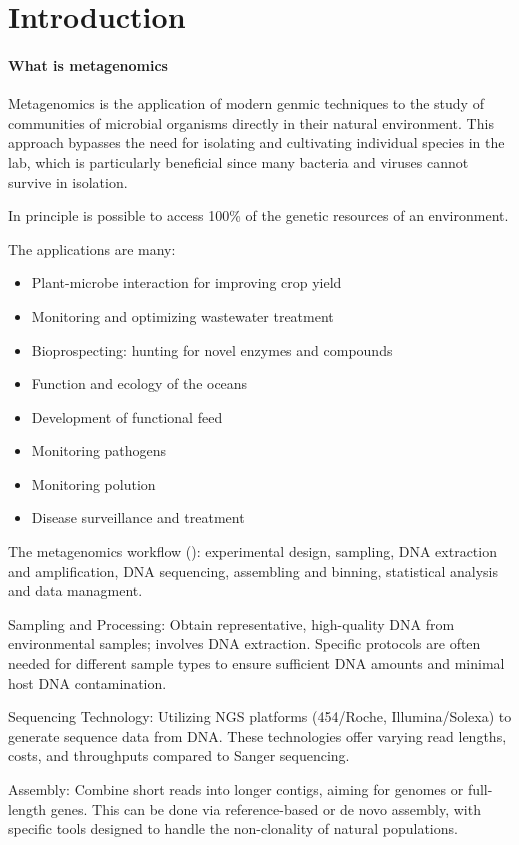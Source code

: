 \section{Introduction}
\paragraph{What is metagenomics} Metagenomics is the application of modern genmic techniques to the study of communities of microbial organisms directly in their natural environment. This approach bypasses the need for isolating and cultivating individual species in the lab, which is particularly beneficial since many bacteria and viruses cannot survive in isolation.

In principle is possible to access 100\% of the genetic resources of an environment.

The applications are many:
\begin{itemize}
    \item Plant-microbe interaction for improving crop yield
    \item Monitoring and optimizing wastewater treatment
    \item Bioprospecting: hunting for novel enzymes and compounds
    \item Function and ecology of the oceans
    \item Development of functional feed
    \item Monitoring pathogens
    \item Monitoring polution
    \item Disease surveillance and treatment
\end{itemize}

The metagenomics workflow (\cite{Metagenomics_guide}): experimental design, sampling, DNA extraction and amplification, DNA sequencing, assembling and binning, statistical analysis and data managment.

Sampling and Processing: Obtain representative, high-quality DNA from environmental samples; involves DNA extraction. Specific protocols are often needed for different sample types to ensure sufficient DNA amounts and minimal host DNA contamination.

Sequencing Technology: Utilizing NGS platforms (454/Roche, Illumina/Solexa) to generate sequence data from DNA. These technologies offer varying read lengths, costs, and throughputs compared to Sanger sequencing.

Assembly: Combine short reads into longer contigs, aiming for genomes or full-length genes. This can be done via reference-based or de novo assembly, with specific tools designed to handle the non-clonality of natural populations.

